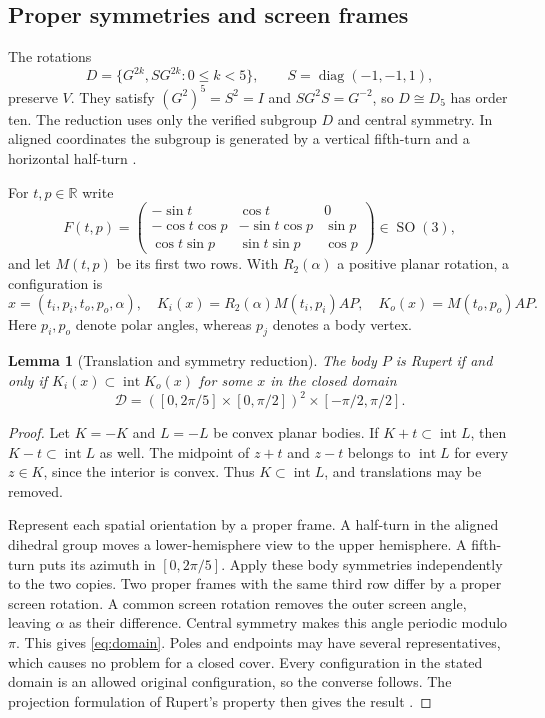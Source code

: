 \documentclass[11pt]{amsart}
\newcommand{\R}{\mathbb R}
\newcommand{\SO}{\operatorname{SO}}
\newcommand{\intr}{\operatorname{int}}
\newcommand{\diag}{\operatorname{diag}}
\newtheorem{lemma}[theorem]{Lemma}
\theoremstyle{definition}
\theoremstyle{remark}
\begin{document}
\subsection{Proper symmetries and screen frames}
The rotations
\[
 D=\{G^{2k},SG^{2k}:0\le k<5\},\qquad S=\diag(-1,-1,1),
\]
preserve $V$. They satisfy $(G^2)^5=S^2=I$ and
$SG^2S=G^{-2}$, so $D\cong D_5$ has order ten. The reduction uses
only the verified subgroup $D$ and central symmetry. In aligned coordinates the subgroup is generated
by a vertical fifth-turn and a horizontal half-turn \cite{input}.

For $t,p\in\R$ write
\begin{equation}\label{eq:frame}
 F(t,p)=\begin{pmatrix}
 -\sin t&\cos t&0\\
 -\cos t\cos p&-\sin t\cos p&\sin p\\
 \cos t\sin p&\sin t\sin p&\cos p
 \end{pmatrix}\in\SO(3),
\end{equation}
and let $M(t,p)$ be its first two rows. With $R_2(\alpha)$ a positive
planar rotation, a configuration is
\[
 x=(t_i,p_i,t_o,p_o,\alpha),\quad
 K_i(x)=R_2(\alpha)M(t_i,p_i)AP,\quad K_o(x)=M(t_o,p_o)AP.
\]
Here $p_i,p_o$ denote polar angles, whereas $p_j$ denotes a body vertex.

\begin{lemma}[Translation and symmetry reduction]\label{lem:reduction}
The body $P$ is Rupert if and only if $K_i(x)\subset\intr K_o(x)$ for
some $x$ in the closed domain
\begin{equation}\label{eq:domain}
 \mathcal D=([0,2\pi/5]\times[0,\pi/2])^2
                         \times[-\pi/2,\pi/2].
\end{equation}
\end{lemma}
\begin{proof}
Let $K=-K$ and $L=-L$ be convex planar bodies. If
$K+t\subset\intr L$, then $K-t\subset\intr L$ as well. The midpoint of
$z+t$ and $z-t$ belongs to $\intr L$ for every $z\in K$, since the
interior is convex. Thus $K\subset\intr L$, and translations may be
removed.

Represent each spatial orientation by a proper frame. A half-turn in
the aligned dihedral group moves a lower-hemisphere view to the upper
hemisphere. A fifth-turn puts its azimuth in $[0,2\pi/5]$. Apply these
body symmetries independently to the two copies. Two proper frames with
the same third row differ by a proper screen rotation. A common screen
rotation removes the outer screen angle, leaving $\alpha$ as their
difference. Central symmetry makes this angle periodic modulo $\pi$.
This gives \eqref{eq:domain}. Poles and endpoints may have several
representatives, which causes no problem for a closed cover. Every
configuration in the stated domain is an allowed original configuration,
so the converse follows. The projection formulation of Rupert's property
then gives the result \cite{sy}.
\end{proof}
\end{document}
